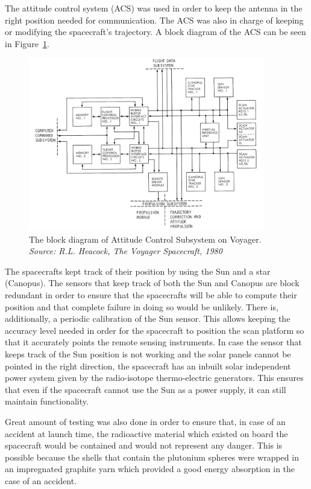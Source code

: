 The attitude control system (ACS) was used in order to keep the antenna in the
right position needed for communication. The ACS was also in charge of keeping
or modifying the spacecraft's trajectory. A block diagram of the ACS can be seen
in Figure~\ref{fig:voyager_bd}.

\begin{figure}[htb]
	\begin{center}
	\includegraphics[width=0.92\textwidth]{img/voyagerACS.png}
	\caption{The block diagram of Attitude Control Subsystem on
	Voyager. \small{\textit{ Source: R.L. Heacock, The Voyager Spacecraft, 1980}}}
	\label{fig:voyager_bd}
	\end{center}
\end{figure}

The spacecrafts kept track of their position by using the Sun and a star
(Canopus). The sensors that keep track of both the Sun and Canopus are block
redundant in order to ensure that the spacecrafts will be able to compute their
position and that complete failure in doing so would be unlikely. There is,
additionally, a periodic calibration of the Sun sensor. This allows keeping the
accuracy level needed in order for the spacecraft to position the scan platform
so that it accurately points the remote sensing instruments. In case the sensor
that keeps track of the Sun position is not working and the solar panels cannot
be pointed in the right direction, the spacecraft has an inbuilt solar
independent power system given by the radio-isotope thermo-electric generators.
This ensures that even if the spacecraft cannot use the Sun as a power supply,
it can still maintain functionality. 

Great amount of testing was also done in order to ensure that, in case of an
accident at launch time, the radioactive material which existed on board the
spacecraft would be contained and would not represent any danger. This is
possible because the shells that contain the plutonium spheres were wrapped in
an impregnated graphite yarn which provided a good energy absorption in the case
of an accident.

